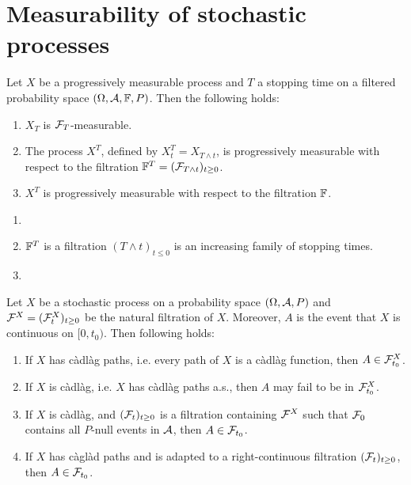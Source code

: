 \section{Measurability of stochastic processes}

 Let $X$ be a progressively
measurable process and $T$ a stopping time on a filtered probability space
$(\Omega, \mathcal A, \mathbb F, P)$. Then the following holds:
\begin{enumerate}
    \item $X_T$ is $\mathcal F_{T}$-measurable.
    \item The process $X^{T}$, defined by $X^{T}_{t} = X_{T \wedge t}$, is
        progressively measurable with respect to the filtration $\mathbb F^{T} =
        (\mathcal F_{T \wedge t})_{t\geq 0}$.
    \item $X^T$ is progressively measurable with respect to the filtration $\mathbb F$.
\end{enumerate}

\solution
\begin{enumerate}
    \item 
    \item $\mathbb F^{T}$ is a filtration $(T \wedge t)_{t\leq 0}$ is an increasing 
        family of stopping times.
    \item 
\end{enumerate}

 Let $X$ be a stochastic process
on a probability space $(\Omega, \mathcal A, P)$ and $\mathcal F^{X}=(\mathcal F^{X}_{t})_{t\geq 0}$
be the natural filtration of $X$. Moreover, $A$ is the event that $X$ is
continuous on $[0, t_0)$. Then following holds:
\begin{enumerate}
    \item If $X$ has c\`adl\`ag paths, i.e. every path of $X$ is a c\`adl\`ag
        function, then $A\in \mathcal F^{X}_{t_0}$. 

    \item If $X$ is c\`adl\`ag, i.e. $X$ has c\`adl\`ag paths a.s., then $A$
        may fail to be in $\mathcal F^{X}_{t_0}$.

    \item If $X$ is c\`adl\`ag, and $(\mathcal F_{t})_{t\geq 0}$ is a filtration
        containing $\mathcal F^{X}$ such that $\mathcal F_{0}$ contains all $P$-null events
        in $\mathcal A$, then $A\in \mathcal F_{t_0}$.

    \item If $X$ has c\`agl\`ad paths and is adapted to a right-continuous
        filtration $(\mathcal F_{t})_{t\geq 0}$, then $A\in \mathcal F_{t_{0}}$. 
\end{enumerate}


